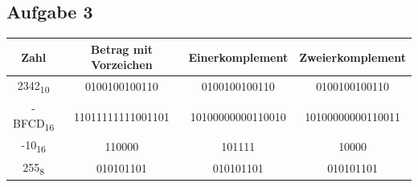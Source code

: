 \documentclass{scrartcl}
\begin{document}
%



	\subsection*{Aufgabe 3}

	\begin{table}[h]

		\begin{tabular}{c|c|c|c}
			Zahl & Betrag mit Vorzeichen & Einerkomplement & Zweierkomplement \\
			\hline
			2342\textsubscript{10} & 0100100100110 & 0100100100110 & 0100100100110 \\

			-BFCD\textsubscript{16} & 11011111111001101 & 10100000000110010 & 10100000000110011 \\
			-10\textsubscript{16} & 110000 & 101111 & 10000 \\
			255\textsubscript{8} & 010101101 & 010101101 & 010101101 \\

		\end{tabular}
	\end{table}
\end{document}
